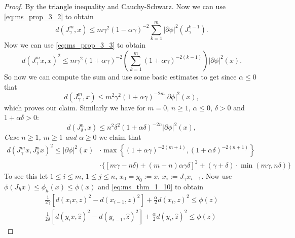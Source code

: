 \documentclass[a4paper,11pt, leqno]{scrreprt} %
\renewcommand{\leq}{\leqslant}
\renewcommand{\leq}{\leqslant}
\renewcommand{\geq}{\geqslant}
\theoremstyle{change}
\theoremstyle{nonumberplain}
\newtheorem{proof}{Proof}
\begin{document}
\begin{proof}
  By the triangle inequality and Cauchy-Schwarz. Now we can use
  \eqref{eq:ms_prop_3_2} to obtain
  \begin{equation}
    \label{eq:ms_thm_1_16}
    d(J_\gamma^m, x) \leq m \gamma^2 (1 - \alpha \gamma)^{-2} \sum_{k
      = 1}^m |\partial \phi|^2(J_\gamma^{k - 1} ).
  \end{equation}
  Now we can use \eqref{eq:ms_prop_3_3} to obtain
  \begin{equation}
    \label{eq:ms_thm_1_17}
    d(J_\gamma^m x, x)^2 \leq m \gamma^2 (1 + \alpha \gamma)^{-2}
    \left ( \sum_{k = 1}^m (1 + \alpha \gamma)^{-2(k - 1)} \right )
    |\partial \phi|^2(x).
  \end{equation}
  So now we can compute the sum and use some basic estimates to get
  since $\alpha \leq 0$ that
  \begin{equation}
    \label{eq:ms_thm_1_18}
    d(J_\gamma^m, x) \leq m^2 \gamma^2 (1 + \alpha \gamma)^{-2m}
    |\partial \phi|^2(x),
  \end{equation}
  which proves our claim. Similarly we have for $m = 0$, $n \geq 1$,
  $\alpha \leq 0$, $\delta > 0$ and $1 + \alpha \delta > 0$:
  \begin{equation}
    \label{eq:ms_thm_1_19}
    d(J_\delta^n, x) \leq n^2 \delta^2 (1 + \alpha \delta)^{-2n}
    |\partial \phi|^2(x),
  \end{equation}
  \textit{Case $n \geq 1$, $m \geq 1$ and $\alpha \geq 0$} we claim
  that
  \begin{equation}
    \label{eq:ms_thm_1_20}
    \begin{split}
    d(J_\gamma^m x, J_\delta^n x)^2 \leq |\partial \phi|^2(x) &\cdot
    \max \left \{(1 + \alpha \gamma)^{-2(m + 1)}, (1 + \alpha \delta)^{-2(n +
        1)} \right \}\\
      &\cdot \{[m \gamma - n \delta) + (m - n) \alpha \gamma \delta ]^2 +
      (\gamma + \delta) \cdot \min(m\gamma, n\delta) \}
    \end{split}
  \end{equation}
  To see this let $1 \leq i \leq m$, $1 \leq j \leq n$, $x_0 = y_0 :=
  x$, $x_i := J_\gamma x_{i - 1}$. Now use $\phi(J_h x) \leq \phi_h(x)
  \leq \phi(x)$ and \eqref{eq:ms_thm_1_10} to obtain
  \begin{align}
    \label{eq:ms_thm_1_21}
    \frac1{2\gamma} [d(x_i x, z)^2 - d(x_{i - 1}, z)^2 ] +
    \frac\alpha2 d(x_i, z)^2 \leq \phi(z)\\
   \label{eq:ms_thm_1_22}
   \frac1{2\delta} [d(y_i x, \hat z)^2 - d(y_{i - 1}, \hat z)^2 ] +
    \frac\alpha2 d(y_i, \hat z)^2 \leq \phi(z)

\end{align}
\end{proof}
\end{document}
